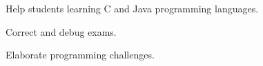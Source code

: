 \documentclass[]{joaosoares-resume}
\begin{document}
\begin{minipage}[t]{0.64\textwidth}
\begin{tightemize}
    \item Help students learning C and Java programming languages.
    \item Correct and debug exams.
    \item Elaborate programming challenges.
\end{tightemize}
\sectionsep
\end{minipage} 
\end{document}
